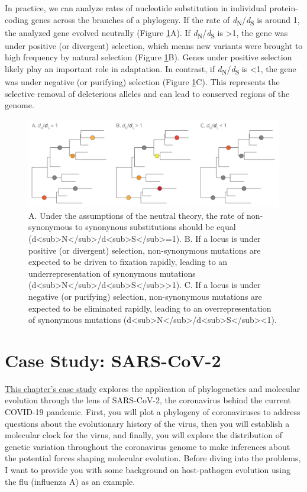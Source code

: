 \documentclass[
]{book}
\begin{document}
In practice, we can analyze rates of nucleotide substitution in individual protein-coding genes across the branches of a phylogeny. If the rate of \emph{d}\textsubscript{N}/\emph{d}\textsubscript{S} is around 1, the analyzed gene evolved neutrally (Figure \ref{fig:dnds}A). If \emph{d}\textsubscript{N}/\emph{d}\textsubscript{S} is \textgreater1, the gene was under positive (or divergent) selection, which means new variants were brought to high frequency by natural selection (Figure \ref{fig:dnds}B). Genes under positive selection likely play an important role in adaptation. In contrast, if \emph{d}\textsubscript{N}/\emph{d}\textsubscript{S} is \textless1, the gene was under negative (or purifying) selection (Figure \ref{fig:dnds}C). This represents the selective removal of deleterious alleles and can lead to conserved regions of the genome.

\begin{figure}
\includegraphics[width=1\linewidth]{images/dnds} \caption{A. Under the assumptions of the neutral theory, the rate of non-synonymous to synonynous substitutions should be equal (d<sub>N</sub>/d<sub>S</sub>=1). B. If a locus is under positive (or divergent) selection, non-synonymous mutations are expected to be driven to fixation rapidly, leading to an underrepresentation of synonymous mutations  (d<sub>N</sub>/d<sub>S</sub>>1). C. If a locus is under negative (or purifying) selection, non-synonymous mutations are expected to be eliminated rapidly, leading to an overrepresentation of synonymous mutations (d<sub>N</sub>/d<sub>S</sub><1).}\label{fig:dnds}
\end{figure}

\hypertarget{case-study-sars-cov-2}{%
\section{Case Study: SARS-CoV-2}\label{case-study-sars-cov-2}}

\href{exercises/BIOL520-ex6.zip}{This chapter's case study} explores the application of phylogenetics and molecular evolution through the lens of SARS-CoV-2, the coronavirus behind the current COVID-19 pandemic. First, you will plot a phylogeny of coronaviruses to address questions about the evolutionary history of the virus, then you will establish a molecular clock for the virus, and finally, you will explore the distribution of genetic variation throughout the coronavirus genome to make inferences about the potential forces shaping molecular evolution. Before diving into the problems, I want to provide you with some background on host-pathogen evolution using the flu (influenza A) as an example.
\end{document}

